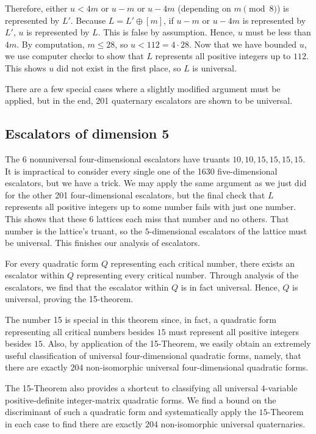 \documentclass[letterpaper, 12pt]{article}
\begin{document}
Therefore, either $u < 4m$ or $u - m$ or $u - 4m$ (depending on $m \pmod 8$) is represented by $L'$. Because $L = L' \oplus [m]$, if $u - m$ or $u - 4m$ is represented by $L'$, $u$ is represented by $L$. This is false by assumption. Hence, $u$ must be less than $4m$. By computation, $m \le 28$, so $u < 112 = 4 \cdot 28$. Now that we have bounded $u$, we use computer checks to show that $L$ represents all positive integers up to $112$. This shows $u$ did not exist in the first place, so $L$ is universal.

There are a few special cases where a slightly modified argument must be applied, but in the end, 201 quaternary escalators are shown to be universal.

\subsection{Escalators of dimension 5}
The $6$ nonuniversal four-dimensional escalators have truants $10,10,15,15,15,15$. It is impractical to consider every single one of the 1630 five-dimensional escalators, but we have a trick. We may apply the same argument as we just did for the other 201 four-dimensional escalators, but the final check that $L$ represents all positive integers up to some number fails with just one number. This shows that these $6$ lattices each miss that number and no others. That number is the lattice's truant, so the $5$-dimensional escalators of the lattice must be universal. This finishes our analysis of escalators.

For every quadratic form $Q$ representing each critical number, there exists an escalator within $Q$ representing every critical number. Through analysis of the escalators, we find that the escalator within $Q$ is in fact universal. Hence, $Q$ is universal, proving the 15-theorem.

The number 15 is special in this theorem since, in fact,
a quadratic form representing all critical numbers besides $15$ must represent all positive integers besides $15$.
Also, by application of the 15-Theorem, we easily obtain an extremely useful classification of universal four-dimensional quadratic forms, namely, that there are exactly $204$ non-isomorphic universal four-dimensional quadratic forms.

The 15-Theorem also provides a shortcut to classifying all universal $4$-variable positive-definite integer-matrix quadratic forms. We find a bound on the discriminant of such a quadratic form and systematically apply the $15$-Theorem in each case to find there are exactly $204$ non-isomorphic universal quaternaries.
\end{document}
